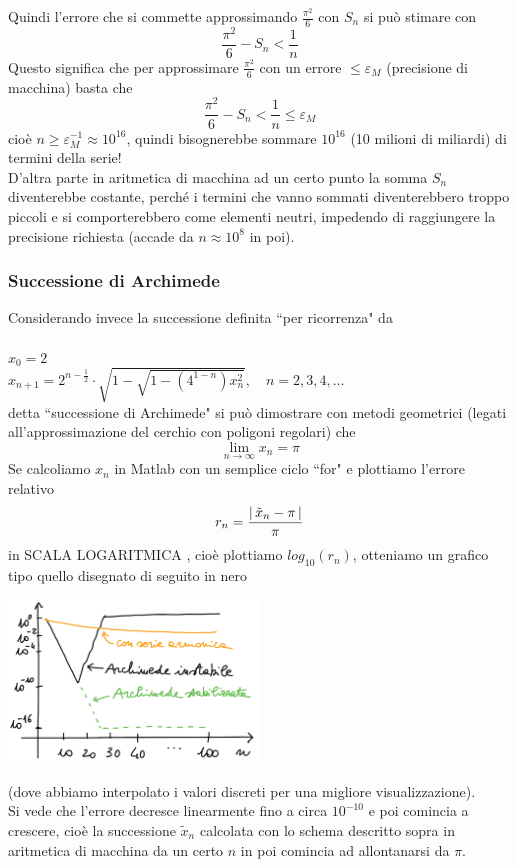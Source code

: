 Quindi l'errore che si commette approssimando $\frac{\pi^2}{6}$ con $S_n$ si può stimare con \[ \frac{\pi^2}{6}-S_n < \frac{1}{n} \]
Questo significa che per approssimare $\frac{\pi^2}{6}$ con un errore $\le \varepsilon_M$ (precisione di macchina) basta che 
\[\frac{\pi^2}{6}-S_n < \frac{1}{n} \le \varepsilon_M \]
cioè $n \ge \varepsilon_M^{-1} \approx 10^{16}$, quindi bisognerebbe sommare $10^{16}$ (10 milioni di miliardi) di termini della serie!\\
D'altra parte in aritmetica di macchina ad un certo punto la somma $S_n$ diventerebbe costante, perché i termini che vanno sommati diventerebbero troppo piccoli e si comporterebbero come elementi neutri, impedendo di raggiungere la precisione richiesta (accade da $n\approx10^8$ in poi).

\subsubsection{Successione di Archimede}
Considerando invece la successione definita ``per ricorrenza" da\\\\
$x_0=2$\\
$x_{n+1}=2^{n-\frac{1}{2}}\cdot\sqrt{1-\sqrt{1-(4^{1-n})x_{n}^2}}, \quad n=2,3,4,\dotsc$\\
detta ``successione di Archimede" si può dimostrare con metodi geometrici (legati all'approssimazione del cerchio con poligoni regolari) che 
\[ \lim_{n\to\infty} x_n= \pi \]
Se calcoliamo $x_n$ in Matlab con un semplice ciclo ``for" e plottiamo l'errore relativo \[ r_n=\frac{\lvert\,\tilde{x}_n-\pi\,\rvert}{\pi} \] in SCALA LOGARITMICA , cioè plottiamo $log_{10}(r_n)$, otteniamo un grafico tipo quello disegnato di seguito in nero
\begin{center}
    \includegraphics[width=0.5\textwidth]{foto/img14}
\end{center}
(dove abbiamo interpolato i valori discreti per una migliore visualizzazione).\\
Si vede che l'errore decresce linearmente fino a circa $10^{-10}$ e poi comincia a crescere, cioè la successione $\tilde{x}_n$ calcolata con lo schema descritto sopra in aritmetica di macchina da un certo $n$ in poi comincia ad allontanarsi da $\pi$.\\
